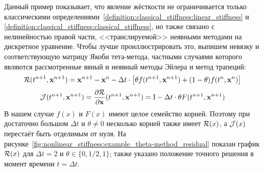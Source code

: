 Данный пример показывает, что явление жёсткости не ограничивается только
классическими определениями~\ref{definition:classical_stiffness:linear_stiffness}
и \ref{definition:classical_stiffness:classical_stiffness},
но также связано с нелинейностью правой части,
<<транслируемой>> неявными методами на дискретное уравнение.
Чтобы лучше проиллюстрировать это,
выпишем невязку и соответствующую матрицу Якоби тета-метода,
частными случаями которого являются рассмотренные явный и неявный методы Эйлера и метод трапеций:
%
\begin{equation}
    \label{eq:nonlinear_stiffness:theta-method_residual}
    \mathcal{R}(t^{n+1}, \mathbf{x}^{n+1}) = \mathbf{x}^{n+1} - \mathbf{x}^n -
    \Delta t \cdot \left[ \theta f(t^{n+1}, \mathbf{x}^{n+1}) + (1 - \theta) f(t^n, \mathbf{x}^n) \right]
\end{equation}
%
\begin{equation}
    \label{eq:nonlinear_stiffness:theta-method_jacobian}
    \mathcal{J}(t^{n+1}, \mathbf{x}^{n+1}) = \frac{\partial \mathcal{R}}{\partial \mathbf{x}}(t^{n+1}, \mathbf{x}^{n+1}) =
    \mathrm{I} - \Delta t \cdot \theta F(t^{n+1}, \mathbf{x}^{n+1})
\end{equation}
%
В нашем случае $ f(x) $ и $ F(x) $ имеют целое семейство корней.
Поэтому при достаточно большом $ \Delta t $ и $ \theta \neq 0 $ несколько корней также имеет $ \mathcal{R}(x) $,
а $ \mathcal{J}(x) $ перестаёт быть отделимым от нуля.
На рисунке~\ref{fig:nonlinear_stiffness:example_theta-method_residual}
показан график $ \mathcal{R}(x) $ для $ \Delta t = 2 $ и $ \theta \in \{0, 1/2, 1\} $;
также указано положение точного решения в момент времени $ t = \Delta t $.

